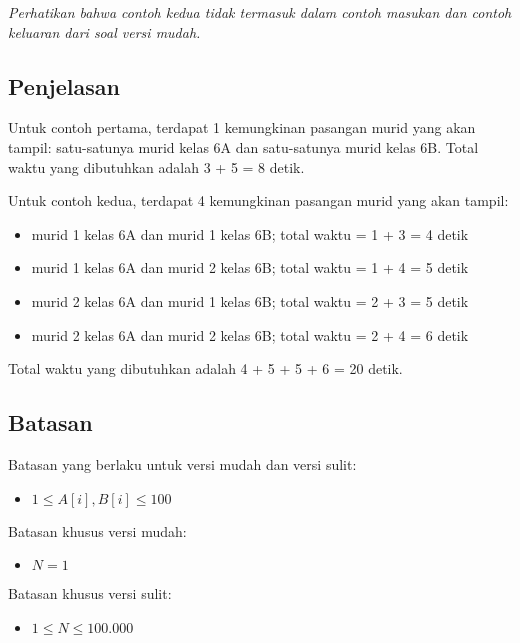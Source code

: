 \documentclass[../main_problemset.tex]{subfiles} %
\begin{document}
\textit{Perhatikan bahwa contoh kedua tidak termasuk dalam contoh masukan dan contoh keluaran dari soal versi mudah.}

\subsection*{Penjelasan}

Untuk contoh pertama, terdapat 1 kemungkinan pasangan murid yang akan tampil: satu-satunya murid kelas 6A dan satu-satunya murid kelas 6B. Total waktu yang dibutuhkan adalah 3 + 5 = 8 detik.

Untuk contoh kedua, terdapat 4 kemungkinan pasangan murid yang akan tampil:
\begin{itemize}
	\item murid 1 kelas 6A dan murid 1 kelas 6B; total waktu = 1 + 3 = 4 detik
	\item murid 1 kelas 6A dan murid 2 kelas 6B; total waktu = 1 + 4 = 5 detik
	\item murid 2 kelas 6A dan murid 1 kelas 6B; total waktu = 2 + 3 = 5 detik
	\item murid 2 kelas 6A dan murid 2 kelas 6B; total waktu = 2 + 4 = 6 detik
\end{itemize}
Total waktu yang dibutuhkan adalah 4 + 5 + 5 + 6 = 20 detik.

\subsection*{Batasan}

\begin{minipage}[t]{0.47\textwidth}
    
Batasan yang berlaku untuk versi mudah dan versi sulit:

\begin{itemize}
	\item $1 \le A[i], B[i] \le 100$
\end{itemize}
\end{minipage}
\begin{minipage}[t]{0.06\textwidth}
    \hfill
\end{minipage}
\begin{minipage}[t]{0.47\textwidth}
Batasan khusus versi mudah:

\begin{itemize}
	\item $N = 1$
\end{itemize}

\vspace{.2cm}

Batasan khusus versi sulit:

\begin{itemize}
	\item $1 \le N \le 100.000$
\end{itemize}
\end{minipage}
\end{document}
